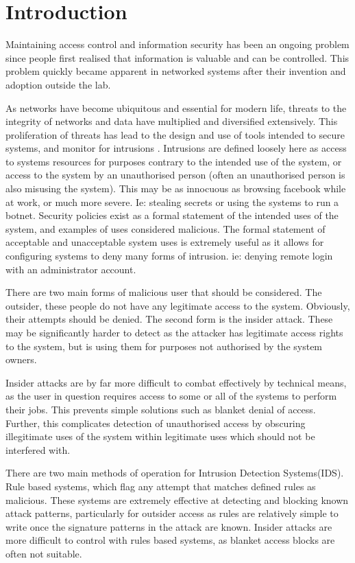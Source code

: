 \chapter{Introduction}\label{C:intro}

Maintaining access control and information security has been an ongoing problem since people first realised that information is valuable and can be controlled. This problem quickly became apparent in networked systems after their invention and adoption outside the lab.

As networks have become ubiquitous and essential for modern life, threats to the integrity of networks and data have multiplied and diversified extensively. 
This proliferation of threats has lead to the design and use of tools intended to secure systems, and monitor for intrusions \cite{zhang2012survey}. Intrusions are defined loosely here as access to systems resources for purposes contrary to the intended use of the system, or access to the system by an unauthorised person (often an unauthorised person is also misusing the system). This may be as innocuous as browsing facebook while at work, or much more severe. Ie: stealing secrets or using the systems to run a botnet. Security policies exist as a formal statement of the intended uses of the system, and examples of uses considered malicious. The formal statement of acceptable and unacceptable system uses is extremely useful as it allows for configuring systems to deny many forms of intrusion. ie: denying remote login with an administrator account. 

There are two main forms of malicious user that should be considered. The outsider, these people do not have any legitimate access to the system. Obviously, their attempts should be denied. The second form is the insider attack. These may be significantly harder to detect as the attacker has legitimate access rights to the system, but is using them for purposes not authorised by the system owners.

Insider attacks are by far more difficult to combat effectively by technical means, as the user in question requires access to some or all of the systems to perform their jobs. This prevents simple solutions such as blanket denial of access. Further, this complicates detection of unauthorised access by obscuring illegitimate uses of the system within legitimate uses which should not be interfered with.

There are two main methods of operation for Intrusion Detection Systems(IDS).
Rule based systems, which flag any attempt that matches defined rules as malicious. These systems are extremely effective at detecting and blocking known attack patterns, particularly for outsider access as rules are relatively simple to write once the signature patterns in the attack are known. Insider attacks are more difficult to control with rules based systems, as blanket access blocks are often not suitable. 

